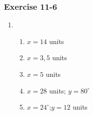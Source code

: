 {\begin{multicols}{3}
% 

\subsubsection*{Exercise 11-6} %

\begin{enumerate}[noitemsep,label=\textbf{\arabic*}.]
      \item %
	    \begin{enumerate}[noitemsep, label=\textbf{(\alph*)} ]
		\item$x=14$ units
\item$x=3,5$ units
\item$x=5$ units
\item$x=28$ units; $y=80^{\circ}$
\item$x=24^{\circ}$;$y=12$ units
	    \end{enumerate}


\end{enumerate}



\end{multicols}}
